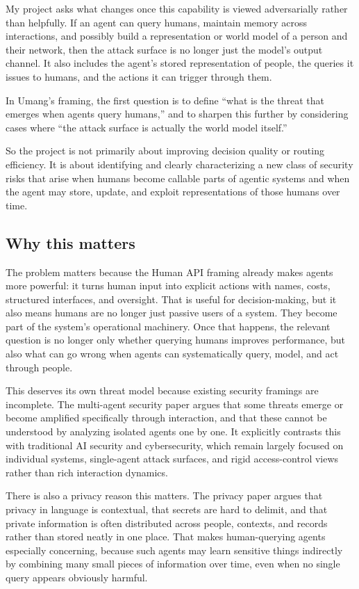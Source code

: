 \documentclass[11pt]{article}
\begin{document}
My project asks what changes once this capability is viewed adversarially rather than helpfully. If an agent can query humans, maintain memory across interactions, and possibly build a representation or world model of a person and their network, then the attack surface is no longer just the model's output channel. It also includes the agent's stored representation of people, the queries it issues to humans, and the actions it can trigger through them.

In Umang's framing, the first question is to define ``what is the threat that emerges when agents query humans,'' and to sharpen this further by considering cases where ``the attack surface is actually the world model itself.''

So the project is not primarily about improving decision quality or routing efficiency. It is about identifying and clearly characterizing a new class of security risks that arise when humans become callable parts of agentic systems and when the agent may store, update, and exploit representations of those humans over time.


\subsection{Why this matters}

The problem matters because the Human API framing already makes agents more powerful: it turns human input into explicit actions with names, costs, structured interfaces, and oversight. That is useful for decision-making, but it also means humans are no longer just passive users of a system. They become part of the system's operational machinery. Once that happens, the relevant question is no longer only whether querying humans improves performance, but also what can go wrong when agents can systematically query, model, and act through people. \citep{oliver2026humanapi}

This deserves its own threat model because existing security framings are incomplete. The multi-agent security paper argues that some threats emerge or become amplified specifically through interaction, and that these cannot be understood by analyzing isolated agents one by one. It explicitly contrasts this with traditional AI security and cybersecurity, which remain largely focused on individual systems, single-agent attack surfaces, and rigid access-control views rather than rich interaction dynamics. \citep{schroeder2025multiagentsecurity}

There is also a privacy reason this matters. The privacy paper argues that privacy in language is contextual, that secrets are hard to delimit, and that private information is often distributed across people, contexts, and records rather than stored neatly in one place. That makes human-querying agents especially concerning, because such agents may learn sensitive things indirectly by combining many small pieces of information over time, even when no single query appears obviously harmful. \citep{brown2022privacylm,nissenbaum2009contextualintegrity}
\end{document}

